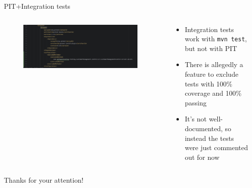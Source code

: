 \documentclass[compress,aspectratio=169]{beamer}
\begin{document}
 	\begin{frame}{PIT+Integration tests}
    \begin{columns}
      \begin{column}{0.5\textwidth}
        \begin{figure}
          \begin{center}
            \includegraphics[width=0.95\textwidth]{excludedmethod.png}
          \end{center}
        \end{figure}
      \end{column}
      \begin{column}{0.5\textwidth}
        \begin{itemize}
                \item Integration tests work with \texttt{mvn test}, but not with PIT
                \item There is allegedly a feature to exclude tests with 100\% coverage and 100\% passing
                \item It's not well-documented, so instead the tests were just commented out for now
        \end{itemize}
      \end{column}
    \end{columns}
	\end{frame}

	\begin{frame}{}
		\label{pg:lastpage} %
    \begin{center}
    \Huge Thanks for your attention!
    \end{center}
	\end{frame}
\end{document}
